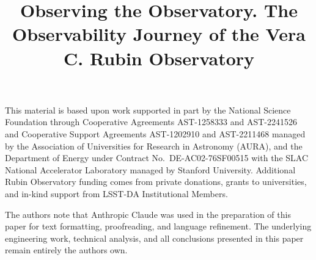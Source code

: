 \documentclass[]{spie}
\begin{document}

\title{Observing the Observatory. The Observability Journey of the Vera C. Rubin Observatory}


\maketitle





















\acknowledgments

This material is based upon work supported in part by the National Science Foundation through Cooperative Agreements AST-1258333 and AST-2241526 and Cooperative Support Agreements AST-1202910 and AST-2211468 managed by the Association of Universities for Research in Astronomy (AURA), and the Department of Energy under Contract No.\ DE-AC02-76SF00515 with the SLAC National Accelerator Laboratory managed by Stanford University.
Additional Rubin Observatory funding comes from private donations, grants to universities, and in-kind support from LSST-DA Institutional Members.

The authors note that Anthropic Claude was used in the preparation of this paper for text formatting, proofreading, and language refinement. The underlying engineering work, technical analysis, and all conclusions presented in this paper remain entirely the authors own.



\end{document}
